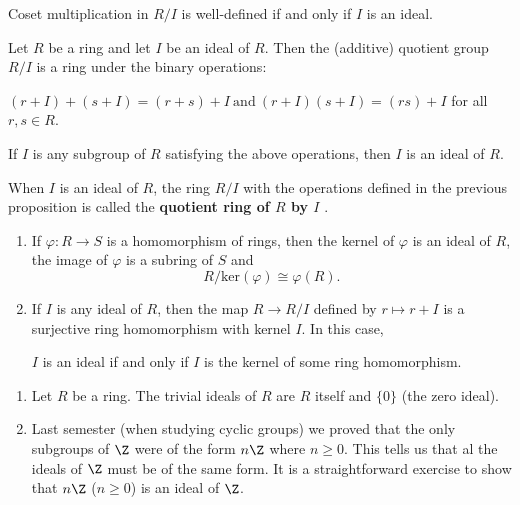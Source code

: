 \begin{prop}
   Coset multiplication in \( R / I \) is well-defined if and only if \( I \) is an ideal. 
\end{prop}

\begin{prop}
    Let \( R \) be a ring and let \( I  \) be an ideal of \( R  \). Then the (additive) quotient group \( R / I \) is a ring under the binary operations:
    \begin{center}
        \( (r+ I) + (s+I) = (r+s)+ I \ \text{and} \ (r+I)(s+I) = (rs) +  I   \) for all \( r,s \in R  \). 
    \end{center}
    If \( I  \) is any subgroup of \( R  \) satisfying the above operations, then \( I  \) is an ideal of \( R  \).
\end{prop}

\begin{definition}
    When \( I \) is an ideal of \( R  \), the ring \( R /I  \) with the operations defined in the previous proposition is called the \textbf{quotient ring of \( R  \) by \( I  \)} .
\end{definition}

\begin{theorem}
    \begin{enumerate}
        \item[(1)] If \( \varphi: R \to S  \) is a homomorphism of rings, then the kernel of \( \varphi  \) is an ideal of \( R  \), the image of \( \varphi  \) is a subring of \( S  \) and 
            \[  R /\text{ker}(\varphi) \cong \varphi(R). \]
        \item[(2)] If \( I  \) is any ideal of \( R  \), then the map \( R \to R / I  \) defined by \( r \mapsto r + I  \) is a surjective ring homomorphism with kernel \( I  \). In this case,  
            \begin{center}
                \( I \) is an ideal if and only if \( I  \) is the kernel of some ring homomorphism.
            \end{center}
    \end{enumerate}
\end{theorem}

\begin{eg}
   \begin{enumerate}
       \item[(1)] Let \( R  \) be a ring. The trivial ideals of \( R  \) are \( R  \) itself and \( \{  0  \}  \) (the zero ideal).
        \item[(2)] Last semester (when studying cyclic groups) we proved that the only subgroups of \( \Z  \) were of the form \( n\Z  \) where \( n \geq 0  \). This tells us that al the ideals of \( \Z  \) must be of the same form. It is a straightforward exercise to show that \( n\Z  \) (\( n \geq 0  \)) is an ideal of \( \Z  \). 
   \end{enumerate}
\end{eg}

